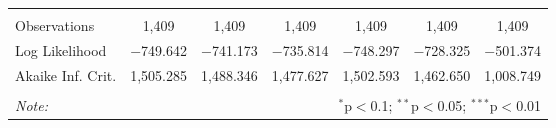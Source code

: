 \begin{tabular}{@{\extracolsep{5pt}}lcccccc}
  & & & & & & \\
\hline \\[-1.8ex]
Observations & 1,409 & 1,409 & 1,409 & 1,409 & 1,409 & 1,409 \\
Log Likelihood & $-$749.642 & $-$741.173 & $-$735.814 & $-$748.297 & $-$728.325 & $-$501.374 \\
Akaike Inf. Crit. & 1,505.285 & 1,488.346 & 1,477.627 & 1,502.593 & 1,462.650 & 1,008.749 \\
\hline
\hline \\[-1.8ex]
\textit{Note:}  & \multicolumn{6}{r}{$^{*}$p$<$0.1; $^{**}$p$<$0.05; $^{***}$p$<$0.01} \\
\end{tabular}
